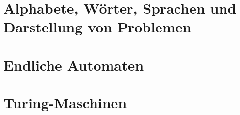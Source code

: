 \documentclass{article}
\begin{document}
\newpage





\newsection
\section{Alphabete, Wörter, Sprachen und Darstellung von Problemen}





\newsection
\section{Endliche Automaten}





\newsection
\section{Turing-Maschinen}
\setcounter{subsection}{2}

\end{document}
